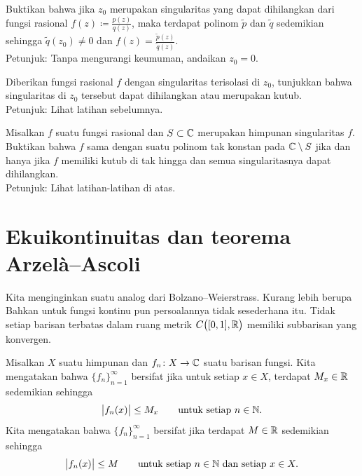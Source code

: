 \begin{exercise}
Buktikan bahwa jika $z_0$ merupakan singularitas yang dapat dihilangkan dari fungsi
rasional $f(z) \coloneqq \frac{p(z)}{q(z)}$, maka terdapat
polinom $\widetilde{p}$ dan $\widetilde{q}$ sedemikian sehingga
$\widetilde{q}(z_0) \neq 0$ dan $f(z) =
\frac{\widetilde{p}(z)}{\widetilde{q}(z)}$.
\\
Petunjuk: Tanpa mengurangi keumuman, andaikan $z_0 = 0$.
\end{exercise}

\begin{exercise}
Diberikan fungsi rasional $f$ dengan singularitas terisolasi di $z_0$,
tunjukkan bahwa singularitas di $z_0$ tersebut dapat dihilangkan atau merupakan kutub.
\\
Petunjuk: Lihat latihan sebelumnya.
\end{exercise}

\begin{exercise}
Misalkan $f$ suatu fungsi rasional dan $S \subset {\mathbb{C}}$ merupakan
himpunan singularitas $f$.
Buktikan bahwa $f$ sama dengan suatu polinom tak konstan pada ${\mathbb{C}} \setminus S$
jika dan hanya jika
$f$ memiliki kutub di tak hingga dan semua singularitasnya dapat dihilangkan.
\\
Petunjuk: Lihat latihan-latihan di atas.
\end{exercise}




\sectionnewpage
\section{Ekuikontinuitas dan teorema Arzel\`a--Ascoli}
\label{sec:arzelaascoli}


Kita menginginkan suatu analog dari Bolzano--Weierstrass.  Kurang lebih berupa
Bahkan untuk fungsi kontinu pun persoalannya
tidak sesederhana itu.
Tidak setiap barisan terbatas dalam ruang metrik $C\bigl([0,1],{\mathbb{R}}\bigr)$ memiliki
subbarisan yang konvergen.

\begin{defn}
Misalkan $X$ suatu himpunan dan
$f_n \colon X \to {\mathbb{C}}$ suatu barisan fungsi.  Kita mengatakan bahwa
$\{ f_n \}_{n=1}^\infty$
bersifat \emph{} jika untuk setiap $x \in X$, terdapat $M_x \in {\mathbb{R}}$
sedemikian sehingga
\begin{equation*}
\bigl\lvert {f_n(x)} \bigr\rvert \leq M_x \qquad \text{untuk setiap } n \in {\mathbb{N}} .
\end{equation*}
Kita mengatakan bahwa
$\{ f_n \}_{n=1}^\infty$
bersifat \emph{} jika terdapat $M \in {\mathbb{R}}$
sedemikian sehingga
\begin{equation*}
\bigl\lvert {f_n(x)} \bigr\rvert \leq M \qquad \text{untuk setiap } n \in {\mathbb{N}} \text{ dan setiap } x \in X.
\end{equation*}
\end{defn}

